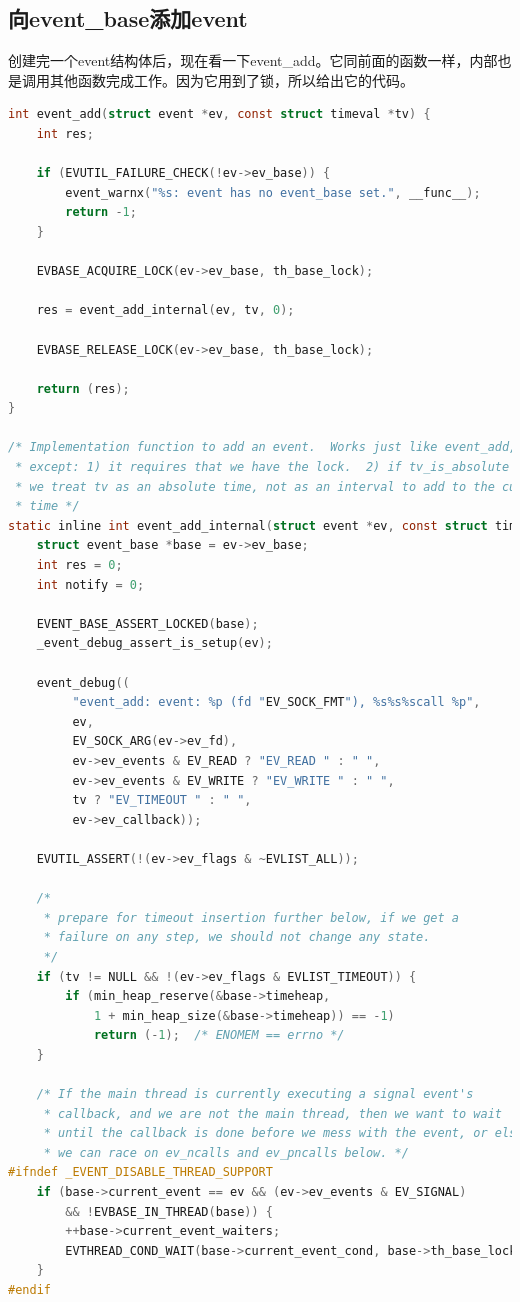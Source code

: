 \documentclass[11pt,a4paper]{article}
\begin{document}
\subsection{向event\_base添加event}
创建完一个event结构体后，现在看一下event\_add。它同前面的函数一样，内部也是调用其他函数完成工作。因为它用到了锁，所以给出它的代码。
\begin{lstlisting}[language=C]
int event_add(struct event *ev, const struct timeval *tv) {
	int res;

	if (EVUTIL_FAILURE_CHECK(!ev->ev_base)) {
		event_warnx("%s: event has no event_base set.", __func__);
		return -1;
	}

	EVBASE_ACQUIRE_LOCK(ev->ev_base, th_base_lock);

	res = event_add_internal(ev, tv, 0);

	EVBASE_RELEASE_LOCK(ev->ev_base, th_base_lock);

	return (res);
}

/* Implementation function to add an event.  Works just like event_add,
 * except: 1) it requires that we have the lock.  2) if tv_is_absolute is set,
 * we treat tv as an absolute time, not as an interval to add to the current
 * time */
static inline int event_add_internal(struct event *ev, const struct timeval *tv, int tv_is_absolute) {
	struct event_base *base = ev->ev_base;
	int res = 0;
	int notify = 0;

	EVENT_BASE_ASSERT_LOCKED(base);
	_event_debug_assert_is_setup(ev);

	event_debug((
		 "event_add: event: %p (fd "EV_SOCK_FMT"), %s%s%scall %p",
		 ev,
		 EV_SOCK_ARG(ev->ev_fd),
		 ev->ev_events & EV_READ ? "EV_READ " : " ",
		 ev->ev_events & EV_WRITE ? "EV_WRITE " : " ",
		 tv ? "EV_TIMEOUT " : " ",
		 ev->ev_callback));

	EVUTIL_ASSERT(!(ev->ev_flags & ~EVLIST_ALL));

	/*
	 * prepare for timeout insertion further below, if we get a
	 * failure on any step, we should not change any state.
	 */
	if (tv != NULL && !(ev->ev_flags & EVLIST_TIMEOUT)) {
		if (min_heap_reserve(&base->timeheap,
			1 + min_heap_size(&base->timeheap)) == -1)
			return (-1);  /* ENOMEM == errno */
	}

	/* If the main thread is currently executing a signal event's
	 * callback, and we are not the main thread, then we want to wait
	 * until the callback is done before we mess with the event, or else
	 * we can race on ev_ncalls and ev_pncalls below. */
#ifndef _EVENT_DISABLE_THREAD_SUPPORT
	if (base->current_event == ev && (ev->ev_events & EV_SIGNAL)
	    && !EVBASE_IN_THREAD(base)) {
		++base->current_event_waiters;
		EVTHREAD_COND_WAIT(base->current_event_cond, base->th_base_lock);
	}
#endif


\end{lstlisting}
\end{document}
